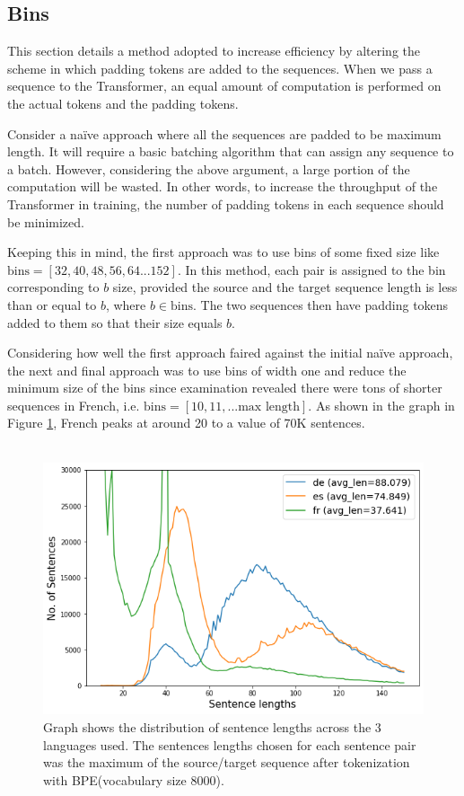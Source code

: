 \documentclass[12pt,a4paper,twoside,openright]{report}
\begin{document}
\subsection{Bins}
\label{bins}
This section details a method adopted to increase efficiency by altering the scheme in which padding tokens are added to the sequences. When we pass a sequence to the Transformer, an equal amount of computation is performed on the actual tokens and the padding tokens.

Consider a na\"ive approach where all the sequences are padded to be maximum length. It will require a basic batching algorithm that can assign any sequence to a batch. However, considering the above argument, a large portion of the computation will be wasted. In other words, to increase the throughput of the Transformer in training, the number of padding tokens in each sequence should be minimized.

Keeping this in mind, the first approach was to use bins of some fixed size like \\$\text{bins} = [32, 40, 48, 56, 64...152]$. In this method, each pair is assigned to the bin corresponding to $b$ size, provided the source and the target sequence length is less than or equal to $b$, where $b \in \text{bins}$. The two sequences then have padding tokens added to them so that their size equals $b$.

Considering how well the first approach faired against the initial na\"ive approach, the next and final approach was to use bins of width one and reduce the minimum size of the bins since examination revealed there were tons of shorter sequences in French, i.e. $\text{bins} = [10, 11, ... \text{max length}]$. As shown in the graph in Figure \ref{fig:distribution-across-languages}, French peaks at around 20 to a value of 70K sentences.
\\\\

\begin{figure}
    \centering
    \includegraphics[width=\textwidth*3/4]{figs/length-distribution-across-languages.png}
    \caption{Graph shows the distribution of sentence lengths across the 3 languages used. The sentences lengths chosen for each sentence pair was the maximum of the source/target sequence after tokenization with BPE(vocabulary size 8000).}
    \label{fig:distribution-across-languages}
\end{figure}
\end{document}
